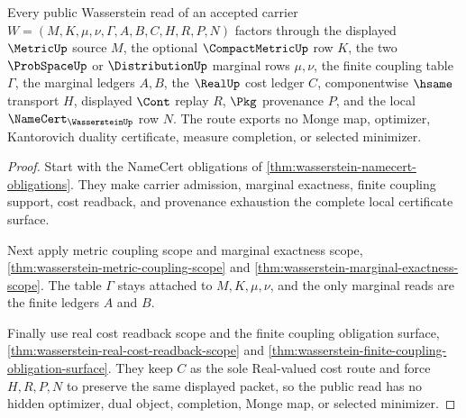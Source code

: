 \begin{theorem}
\label{thm:wasserstein-transport-plan-public-route}
Every public Wasserstein read of an accepted carrier $W=(M,K,\mu,\nu,\Gamma,A,B,C,H,R,P,N)$ factors through the displayed $\MetricUp$ source $M$, the optional $\CompactMetricUp$ row $K$, the two $\ProbSpaceUp$ or $\DistributionUp$ marginal rows $\mu,\nu$, the finite coupling table $\Gamma$, the marginal ledgers $A,B$, the $\RealUp$ cost ledger $C$, componentwise $\hsame$ transport $H$, displayed $\Cont$ replay $R$, $\Pkg$ provenance $P$, and the local $\NameCert_{\WassersteinUp}$ row $N$. The route exports no Monge map, optimizer, Kantorovich duality certificate, measure completion, or selected minimizer.
\end{theorem}
\begin{proof}
Start with the NameCert obligations of \autoref{thm:wasserstein-namecert-obligations}. They make carrier admission, marginal exactness, finite coupling support, cost readback, and provenance exhaustion the complete local certificate surface.

Next apply metric coupling scope and marginal exactness scope, \autoref{thm:wasserstein-metric-coupling-scope} and \autoref{thm:wasserstein-marginal-exactness-scope}. The table $\Gamma$ stays attached to $M,K,\mu,\nu$, and the only marginal reads are the finite ledgers $A$ and $B$.

Finally use real cost readback scope and the finite coupling obligation surface, \autoref{thm:wasserstein-real-cost-readback-scope} and \autoref{thm:wasserstein-finite-coupling-obligation-surface}. They keep $C$ as the sole Real-valued cost route and force $H,R,P,N$ to preserve the same displayed packet, so the public read has no hidden optimizer, dual object, completion, Monge map, or selected minimizer.
\end{proof}


